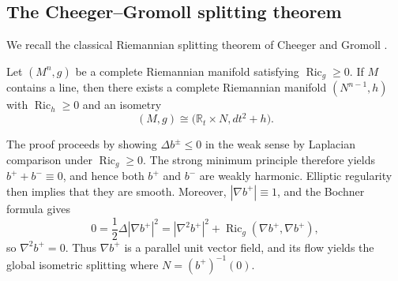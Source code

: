 \documentclass[11pt,twoside]{amsart}
\DeclareMathOperator{\Ric}{Ric}
\begin{document}
\subsection{The Cheeger--Gromoll splitting theorem}

We recall the classical Riemannian splitting theorem of Cheeger and Gromoll
\cite{CGsplitting}.


\begin{theorem}
\label{thm:cheeger-gromoll}
Let $(M^n,g)$ be a complete Riemannian manifold satisfying
$
    \Ric_g\geq 0.
$
If $M$ contains a line, then there exists a complete Riemannian manifold
$(N^{n-1},h)$ with $\Ric_h \ge 0$ and an isometry
\[
    (M,g)
    \cong
    \bigl(\mathbb{R}_t \times N,dt^2+h\bigr).
\]
\end{theorem}

The proof proceeds by showing \(
    \Delta b^\pm\leq 0
\) 
in the weak sense by Laplacian comparison
under $\Ric_g\geq 0$. The strong minimum principle therefore yields
$b^+ + b^- \equiv 0$, and hence both $b^+$ and $b^-$ are weakly harmonic.
Elliptic regularity then implies that they are smooth. Moreover,
$|\nabla b^+|\equiv 1$, and the Bochner formula gives
\[
    0
    =
    \frac{1}{2}\Delta |\nabla b^+|^2
    =
    |\nabla^2 b^+|^2
    +
    \Ric_g(\nabla b^+,\nabla b^+),
\]
so $\nabla^2 b^+=0$. Thus $\nabla b^+$ is a parallel unit vector field, and
its flow yields the global isometric splitting where $N=(b^+)^{-1}(0)$.


\end{document}
